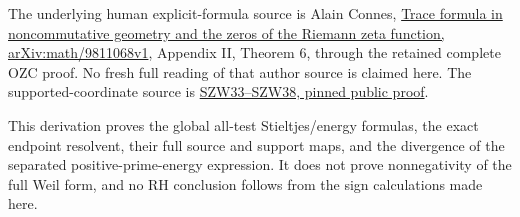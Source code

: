 The underlying human explicit-formula source is Alain Connes,
\href{https://arxiv.org/abs/math/9811068v1}{Trace formula in
noncommutative geometry and the zeros of the Riemann zeta function,
arXiv:math/9811068v1}, Appendix II, Theorem 6, through the retained
complete OZC proof. No fresh full reading of that author source is
claimed here. The supported-coordinate source is
\href{https://github.com/KokunoYumeto/zeta-function-research-reader/blob/76f421965914beb133df797835f940849844dc4f/workbenches/splitzero-tandem/branches/tau-zero-prime-positivity/SUPPORTED_ZERO_PRIME_WEIL_DERIVATION.md}{SZW33--SZW38,
pinned public proof}.

This derivation proves the global all-test Stieltjes/energy formulas,
the exact endpoint resolvent, their full source and support maps, and
the divergence of the separated positive-prime-energy expression. It
does not prove nonnegativity of the full Weil form, and no RH conclusion
follows from the sign calculations made here.
